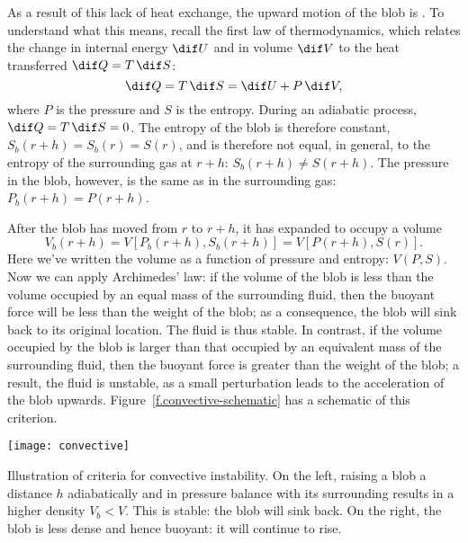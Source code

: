 As a result of this lack of heat exchange, the upward motion of the blob is .  To understand what this means, recall the first law of thermodynamics\cite{Fermi1956Thermodynamics}, which relates the change in internal energy $\dif U$ and in volume $\dif V$ to the heat transferred $\dif Q = T\,\dif S$:
\begin{equation}\label{e.first-law-thermo}
	\dif Q = T\,\dif S = \dif U + P\,\dif V,
\end{equation}
where $P$ is the pressure and $S$ is the entropy. During an adiabatic process, $\dif Q = T\,\dif S = 0$. The entropy of the blob is therefore constant, 
$S_{b}(r+h) = S_{b}(r) = S(r)$, and is therefore not equal, in general, to the entropy of the surrounding gas at $r+h$: $S_{b}(r+h)  \neq S(r+h)$. The pressure in the blob, however, is the same as in the surrounding gas: $P_{b}(r+h) = P(r+h)$.

After the blob has moved from $r$ to $r+h$, it has expanded to occupy a volume
\[
	V_{b}(r+h) = V[P_{b}(r+h),S_{b}(r+h)] = V[P(r+h),S(r)].
\]
Here we've written the volume as a function of pressure and entropy: $V(P,S)$. Now we can apply Archimedes' law: if the volume of the blob is less than the volume occupied by an equal mass of the surrounding fluid, then the buoyant force will be less than the weight of the blob; as a consequence, the blob will sink back to its original location. The fluid is thus stable. In contrast, if the volume occupied by the blob is larger than that occupied by an equivalent mass of the surrounding fluid, then the buoyant force is greater than the weight of the blob; a result, the fluid is unstable, as a small perturbation leads to the acceleration of the blob upwards. Figure~\ref{f.convective-schematic} has a schematic of this criterion.
\begin{marginfigure}
\texttt{[image: convective]}
\caption[Illustration of criteria for convective instability.]{\label{f.convective-schematic}Illustration of criteria for convective instability.  On the left, raising a blob a distance $h$ adiabatically and in pressure balance with its surrounding results in a higher density $V_{b} < V$.  This is stable: the blob will sink back.  On the right, the blob is less dense and hence buoyant: it will continue to rise.}
\end{marginfigure}

